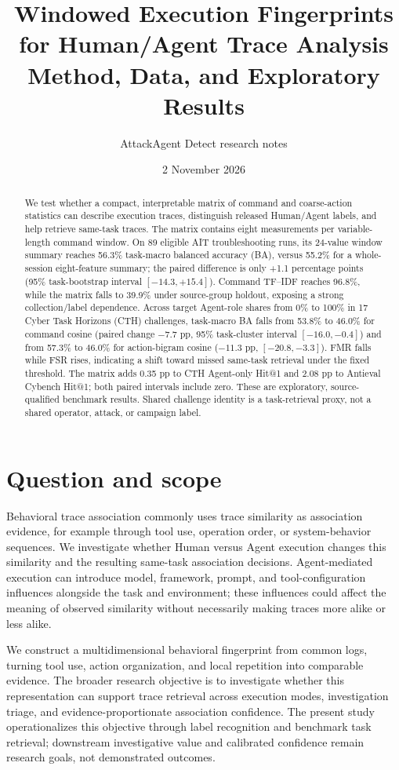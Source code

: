 \documentclass[11pt]{article}
\title{Windowed Execution Fingerprints for Human/Agent Trace Analysis\\\large Method, Data, and Exploratory Results}
\author{AttackAgent Detect research notes}
\date{2 November 2026}
\begin{document}
\maketitle

\begin{abstract}
We test whether a compact, interpretable matrix of command and coarse-action statistics can describe execution traces, distinguish released Human/Agent labels, and help retrieve same-task traces. The matrix contains eight measurements per variable-length command window. On 89 eligible AIT troubleshooting runs, its 24-value window summary reaches 56.3\% task-macro balanced accuracy (BA), versus 55.2\% for a whole-session eight-feature summary; the paired difference is only +1.1 percentage points (95\% task-bootstrap interval $[-14.3,+15.4]$). Command TF--IDF reaches 96.8\%, while the matrix falls to 39.9\% under source-group holdout, exposing a strong collection/label dependence. Across target Agent-role shares from 0\% to 100\% in 17 Cyber Task Horizons (CTH) challenges, task-macro BA falls from 53.8\% to 46.0\% for command cosine (paired change $-7.7$ pp, 95\% task-cluster interval $[-16.0,-0.4]$) and from 57.3\% to 46.0\% for action-bigram cosine ($-11.3$ pp, $[-20.8,-3.3]$). FMR falls while FSR rises, indicating a shift toward missed same-task retrieval under the fixed threshold. The matrix adds 0.35 pp to CTH Agent-only Hit@1 and 2.08 pp to Antieval Cybench Hit@1; both paired intervals include zero. These are exploratory, source-qualified benchmark results. Shared challenge identity is a task-retrieval proxy, not a shared operator, attack, or campaign label.
\end{abstract}

\section{Question and scope}
Behavioral trace association commonly uses trace similarity as association evidence, for example through tool use, operation order, or system-behavior sequences. We investigate whether Human versus Agent execution changes this similarity and the resulting same-task association decisions. Agent-mediated execution can introduce model, framework, prompt, and tool-configuration influences alongside the task and environment; these influences could affect the meaning of observed similarity without necessarily making traces more alike or less alike.

We construct a multidimensional behavioral fingerprint from common logs, turning tool use, action organization, and local repetition into comparable evidence. The broader research objective is to investigate whether this representation can support trace retrieval across execution modes, investigation triage, and evidence-proportionate association confidence. The present study operationalizes this objective through label recognition and benchmark task retrieval; downstream investigative value and calibrated confidence remain research goals, not demonstrated outcomes.
\end{document}
